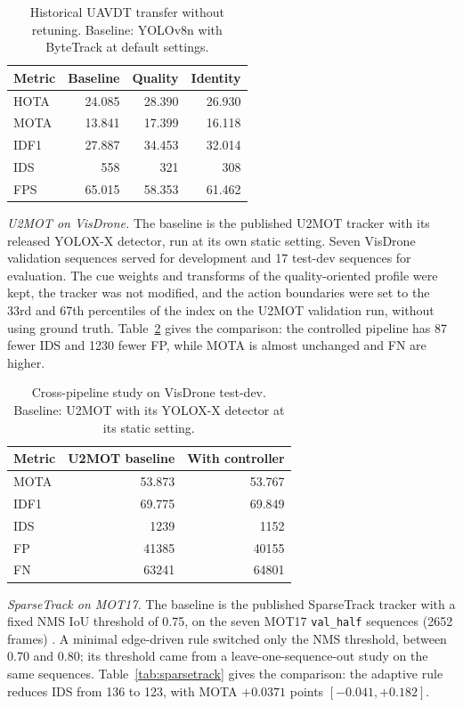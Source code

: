 \documentclass[pdflatex,sn-mathphys-num,iicol]{sn-jnl}
\begin{document}
\begin{table}[t]
\caption{Historical UAVDT transfer without retuning. Baseline: YOLOv8n with
ByteTrack at default settings.}
\label{tab:hist-uavdt}
\centering\footnotesize
\setlength{\tabcolsep}{4pt}
\begin{tabular}{@{}lrrr@{}}
\toprule
Metric & Baseline & Quality & Identity\\
\midrule
HOTA & 24.085 & 28.390 & 26.930\\
MOTA & 13.841 & 17.399 & 16.118\\
IDF1 & 27.887 & 34.453 & 32.014\\
IDS & 558 & 321 & 308\\
FPS & 65.015 & 58.353 & 61.462\\
\bottomrule
\end{tabular}
\end{table}

\emph{U2MOT on VisDrone.} The baseline is the published U2MOT tracker
\cite{liu2023u2mot} with its released YOLOX-X detector, run
at its own static setting. Seven VisDrone validation sequences served for
development and 17 test-dev sequences for evaluation. The cue weights and
transforms of the quality-oriented profile were kept, the tracker was not
modified, and the action boundaries were set to the 33rd and 67th percentiles
of the index on the U2MOT validation run, without using ground truth.
Table~\ref{tab:u2mot} gives the comparison: the controlled pipeline has 87
fewer IDS and 1230 fewer FP, while MOTA is almost unchanged and FN are higher.

\begin{table}[t]
\caption{Cross-pipeline study on VisDrone test-dev. Baseline: U2MOT with its
YOLOX-X detector at its static setting.}
\label{tab:u2mot}
\centering\footnotesize
\setlength{\tabcolsep}{4pt}
\begin{tabular}{@{}lrr@{}}
\toprule
Metric & U2MOT baseline & With controller\\
\midrule
MOTA & 53.873 & 53.767\\
IDF1 & 69.775 & 69.849\\
IDS & 1239 & 1152\\
FP & 41385 & 40155\\
FN & 63241 & 64801\\
\bottomrule
\end{tabular}
\end{table}

\emph{SparseTrack on MOT17.} The baseline is the published SparseTrack tracker
\cite{liu2025sparsetrack} with a fixed NMS IoU threshold of 0.75, on the seven
MOT17 \texttt{val\_half} sequences (2652 frames) \cite{dendorfer2021motchallenge}.
A minimal edge-driven rule switched only the NMS threshold, between 0.70 and
0.80; its threshold came from a leave-one-sequence-out study on the same
sequences. Table~\ref{tab:sparsetrack} gives the comparison: the adaptive rule
reduces IDS from 136 to 123, with MOTA $+0.0371$ points $[-0.041, +0.182]$.
\end{document}
